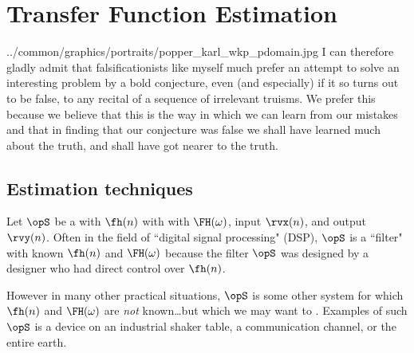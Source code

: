 \chapter{Transfer Function Estimation}
\label{chp:systemid}
  {../common/graphics/portraits/popper_karl_wkp_pdomain.jpg}
  {%
  I can therefore gladly admit that falsificationists like myself much
  prefer an attempt to solve an interesting problem by a bold conjecture,
  even (and especially) if it so turns out to be false,
  to any recital of a sequence of irrelevant truisms.
  We prefer this because we believe that this is the way in which we can
  learn from our mistakes and that in finding that our conjecture was false
  we shall have learned much about the truth,
  and shall have got nearer to the truth.%
  }

\section{Estimation techniques}
Let $\opS$ be a  with  $\fh(n)$ with
with  $\FH(\omega)$,
input $\rvx(n)$, and output $\rvy(n)$.
Often in the field of ``digital signal processing" (DSP), $\opS$ is a ``filter"
with known $\fh(n)$ and $\FH(\omega)$ because the filter $\opS$ was
designed by a designer who had direct control over $\fh(n)$.

However in many other practical situations, $\opS$ is some other system
for which $\fh(n)$ and $\FH(\omega)$ are \emph{not} known\ldots but which we may
want to . Examples of such $\opS$ is a
device on an industrial shaker table, a communication channel, or the entire earth.

